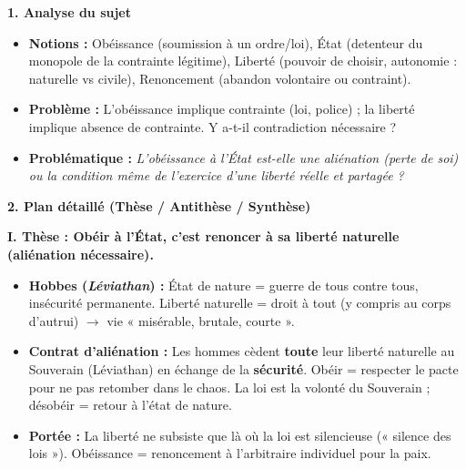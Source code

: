 \documentclass[11pt]{article}
\newcommand{\cle}[1]{{\popxbold\color{popdark}#1}}
\begin{document}
\begin{corrige}
\textbf{1. Analyse du sujet}
\begin{itemize}
\item \textbf{Notions :} \cle{Obéissance} (soumission à un ordre/loi), \cle{État} (detenteur du monopole de la contrainte légitime), \cle{Liberté} (pouvoir de choisir, autonomie : naturelle vs civile), \cle{Renoncement} (abandon volontaire ou contraint).
\item \textbf{Problème :} L'obéissance implique contrainte (loi, police) ; la liberté implique absence de contrainte. Y a-t-il contradiction nécessaire ?
\item \textbf{Problématique :} \emph{L'obéissance à l'État est-elle une aliénation (perte de soi) ou la condition même de l'exercice d'une liberté réelle et partagée ?}
\end{itemize}

\textbf{2. Plan détaillé (Thèse / Antithèse / Synthèse)}

\textbf{I. Thèse : Obéir à l'État, c'est renoncer à sa liberté naturelle (aliénation nécessaire).}
\begin{itemize}
\item \textbf{Hobbes (\emph{Léviathan}) :} État de nature = guerre de tous contre tous, insécurité permanente. Liberté naturelle = droit à tout (y compris au corps d'autrui) $\rightarrow$ vie « misérable, brutale, courte ».
\item \textbf{Contrat d'aliénation :} Les hommes cèdent \textbf{toute} leur liberté naturelle au Souverain (Léviathan) en échange de la \textbf{sécurité}. Obéir = respecter le pacte pour ne pas retomber dans le chaos. La loi est la volonté du Souverain ; désobéir = retour à l'état de nature.
\item \textbf{Portée :} La liberté ne subsiste que là où la loi est silencieuse (« silence des lois »). Obéissance = renoncement à l'arbitraire individuel pour la paix.
\end{itemize}


\end{corrige}
\end{document}
